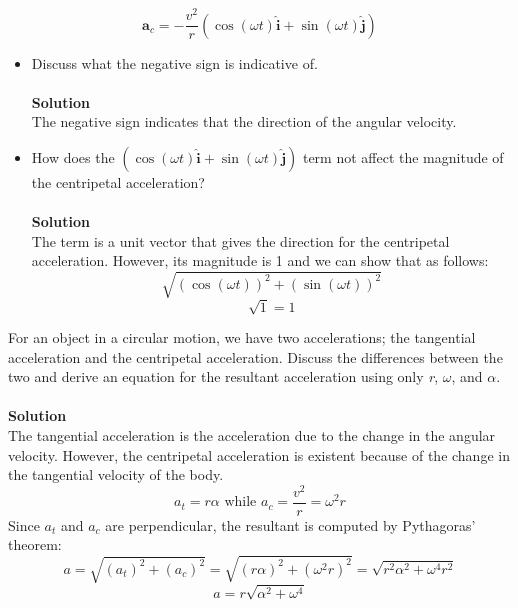 \documentclass[9pt,addpoints]{exam}
\begin{document}
\begin{questions}
		$$\textbf{a}_c=-\dfrac{v^2}{r}(\cos(\omega t)\hat{\textbf{i}}+\sin(\omega t)\hat{\textbf{j}})$$
		\begin{itemize}
			\item Discuss what the negative sign is indicative of. \\  \\ \textbf{Solution} \\
			The negative sign indicates that the direction of the angular velocity.
			\item How does the $(\cos(\omega t)\hat{\textbf{i}}+\sin(\omega t)\hat{\textbf{j}})$ term not affect the magnitude of the centripetal acceleration? \\ \\ \textbf{Solution} \\
			The term is a unit vector that gives the direction for the centripetal acceleration. However, its magnitude is 1 and we can show that as follows:
			$$\sqrt{(\cos(\omega t))^2 + (\sin(\omega t))^2}$$ 
			$$\sqrt{1}=1$$
		\end{itemize}
		\question For an object in a circular motion, we have two accelerations; the tangential acceleration and the centripetal acceleration. Discuss the differences between the two and derive an equation for the resultant acceleration using only \textit{r}, \textit{$\omega$}, and \textit{$\alpha$}. \\ \\ \textbf{Solution} \\
		The tangential acceleration is the acceleration due to the change in the angular velocity. However, the centripetal acceleration is existent because of the change in the tangential velocity of the body.
		$$a_t=r\alpha\text{  while   } a_c=\dfrac{v^2}{r}=\omega^2r$$
		Since $a_t$ and $a_c$ are perpendicular, the resultant is computed by Pythagoras' theorem:
		$$a=\sqrt{(a_t)^2+(a_c)^2}=\sqrt{(r\alpha)^2+(\omega^2r)^2}=\sqrt{r^2\alpha^2+\omega^4r^2}$$
		$$a=r\sqrt{\alpha^2+\omega^4}$$
		

\end{questions}
\end{document}
